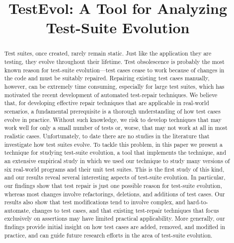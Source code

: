 \documentclass[conference]{IEEEtran}
\begin{document}
\title{TestEvol: A Tool for Analyzing\\Test-Suite Evolution}

\author{
}

\maketitle

\pagestyle{empty}

\begin{abstract}
  Test suites, once created, rarely remain static. Just like the
  application they are testing, they evolve throughout their lifetime.
  Test obsolescence is probably the most known reason for test-suite
  evolution---test cases cease to work because of changes in the code
  and must be suitably repaired. Repairing existing test cases
  manually, however, can be extremely time consuming, especially for
  large test suites, which has motivated the recent development of
  automated test-repair techniques. We believe that, for developing
  effective repair techniques that are applicable in real-world
  scenarios, a fundamental prerequisite is a thorough understanding of
  how test cases evolve in practice. Without such knowledge, we risk
  to develop techniques that may work well for only a small number of
  tests or, worse, that may not work at all in most realistic cases.
  Unfortunately, to date there are no studies in the literature that
  investigate how test suites evolve. To tackle this problem, in this
  paper we present a technique for studying test-suite evolution, a
  tool that implements the technique, and an extensive empirical study
  in which we used our technique to study many versions of six
  real-world programs and their unit test suites. This is the first
  study of this kind, and our results reveal several interesting
  aspects of test-suite evolution. In particular, our findings show
  that test repair is just one possible reason for test-suite
  evolution, whereas most changes involve refactorings, deletions, and
  additions of test cases.  Our results also show that test
  modifications tend to involve complex, and hard-to-automate, changes
  to test cases, and that existing test-repair techniques that focus
  exclusively on assertions may have limited practical applicability.
  More generally, our findings provide initial insight on how test
  cases are added, removed, and modified in practice, and can guide
  future research efforts in the area of test-suite evolution.
\end{abstract}
\end{document}
